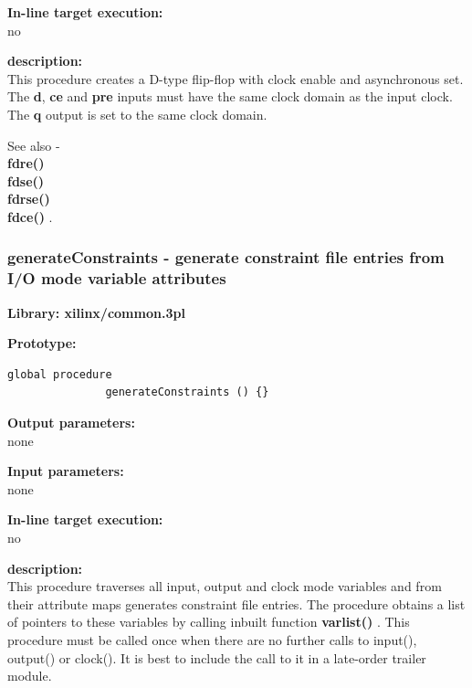             {\bf In-line target execution:} \\
            no

            {\bf description:} \\
            This procedure creates a D-type flip-flop with clock enable and
            asynchronous set. The {\bf d}, {\bf ce} and {\bf pre} inputs must
            have the same clock domain as the input clock. The {\bf q} output
            is set to the same clock domain.
            
            See also - \\
            {\bf fdre()} \\
            {\bf fdse()} \\
            {\bf fdrse()} \\
            {\bf fdce()} .




        \subsubsection{generateConstraints - generate constraint file entries from I/O mode variable attributes}\label{sec:lpgenerateconstraints}
            
            {\bf Library: xilinx/common.3pl}

            {\bf Prototype:} \\
            \vsp
            \begin{lstlisting}[gobble=12, language=threepl]
               global procedure
               generateConstraints () {}
            \end{lstlisting}

            {\bf Output parameters:} \\
            none

            {\bf Input parameters:} \\            
            none
        
            {\bf In-line target execution:} \\
            no

            {\bf description:} \\
            
            This procedure traverses all input, output and clock mode variables
            and from their attribute maps generates constraint file entries. The
            procedure obtains a list of pointers to these variables by calling
            inbuilt function {\bf varlist()} . This
            procedure must be called once when there are no further calls to
            input(), output() or clock(). It is best to include the call to it in
            a late-order trailer module.




